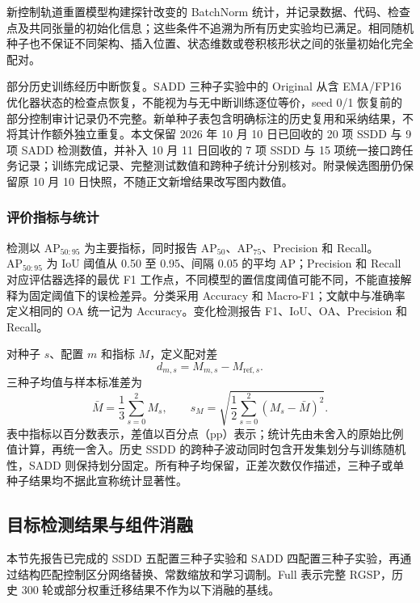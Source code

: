 \documentclass[journal]{IEEEtran}
\begin{document}
新控制轨道重置模型构建探针改变的 BatchNorm 统计，并记录数据、代码、检查点及共同张量的初始化信息；这些条件不追溯为所有历史实验均已满足。相同随机种子也不保证不同架构、插入位置、状态维数或卷积核形状之间的张量初始化完全配对。

部分历史训练经历中断恢复。SADD 三种子实验中的 Original 从含 EMA/FP16 优化器状态的检查点恢复，不能视为与无中断训练逐位等价，seed 0/1 恢复前的部分控制审计记录仍不完整。新单种子表包含明确标注的历史复用和采纳结果，不将其计作额外独立重复。本文保留 2026 年 10 月 10 日已回收的 20 项 SSDD 与 9 项 SADD 检测数值，并补入 10 月 11 日回收的 7 项 SSDD 与 15 项统一接口跨任务记录；训练完成记录、完整测试数值和跨种子统计分别核对。附录候选图册仍保留原 10 月 10 日快照，不随正文新增结果改写图内数值。

\subsubsection{评价指标与统计}
\label{sec:evaluation_metrics}

检测以 $\mathrm{AP}_{50:95}$ 为主要指标，同时报告 $\mathrm{AP}_{50}$、$\mathrm{AP}_{75}$、Precision 和 Recall。$\mathrm{AP}_{50:95}$ 为 IoU 阈值从 0.50 至 0.95、间隔 0.05 的平均 AP；Precision 和 Recall 对应评估器选择的最优 F1 工作点，不同模型的置信度阈值可能不同，不能直接解释为固定阈值下的误检差异。分类采用 Accuracy 和 Macro-F1；文献中与准确率定义相同的 OA 统一记为 Accuracy。变化检测报告 F1、IoU、OA、Precision 和 Recall。

对种子 $s$、配置 $m$ 和指标 $M$，定义配对差
\begin{equation}
d_{m,s}=M_{m,s}-M_{\mathrm{ref},s}.
\label{eq:paired_difference}
\end{equation}
三种子均值与样本标准差为
\begin{equation}
\bar M=\frac{1}{3}\sum_{s=0}^{2}M_s,\qquad
s_M=\sqrt{\frac{1}{2}\sum_{s=0}^{2}(M_s-\bar M)^2}.
\label{eq:experiment_statistics}
\end{equation}
表中指标以百分数表示，差值以百分点（pp）表示；统计先由未舍入的原始比例值计算，再统一舍入。历史 SSDD 的跨种子波动同时包含开发集划分与训练随机性，SADD 则保持划分固定。所有种子均保留，正差次数仅作描述，三种子或单种子结果均不据此宣称统计显著性。


\subsection{目标检测结果与组件消融}
\label{sec:ablation}

本节先报告已完成的 SSDD 五配置三种子实验和 SADD 四配置三种子实验，再通过结构匹配控制区分网络替换、常数缩放和学习调制。Full 表示完整 RGSP，历史 300 轮或部分权重迁移结果不作为以下消融的基线。
\end{document}
